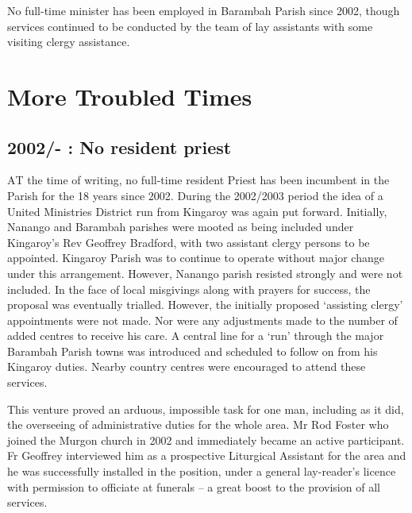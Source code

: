 No full-time minister has been employed in Barambah Parish since 2002, though services continued to be conducted by the team of lay assistants with some visiting clergy assistance.



\balance


\printendnotes[custom]
\setcounter{endnote}{0}
\chapter{More Troubled Times}
\nobalance


\section{2002/- : No resident priest}



\lettrine[lines=3]{A}{T}
 the time of writing, no full-time resident Priest has been incumbent in the Parish for the 18 years since 2002. During the 2002/2003 period the idea of a United Ministries District run from Kingaroy was again put forward. Initially, Nanango and Barambah parishes were mooted as being included under Kingaroy's Rev Geoffrey Bradford, with two assistant clergy persons to be appointed. Kingaroy Parish was to continue to operate without major change under this arrangement. However, Nanango parish resisted strongly and were not included. In the face of local misgivings along with prayers for success, the proposal was eventually trialled. However, the initially proposed `assisting clergy' appointments were not made. Nor were any adjustments made to the number of added centres to receive his care. A central line for a `run' through the major Barambah Parish towns was introduced and scheduled to follow on from his Kingaroy duties. Nearby country centres were encouraged to attend these services.

This venture proved an arduous, impossible task for one man, including as it did, the overseeing of administrative duties for the whole area. Mr Rod Foster who joined the Murgon church in 2002 and immediately became an active participant. Fr Geoffrey interviewed him as a prospective Liturgical Assistant for the area and he was successfully installed in the position, under a general lay-reader's licence with permission to officiate at funerals -- a great boost to the provision of all services.



